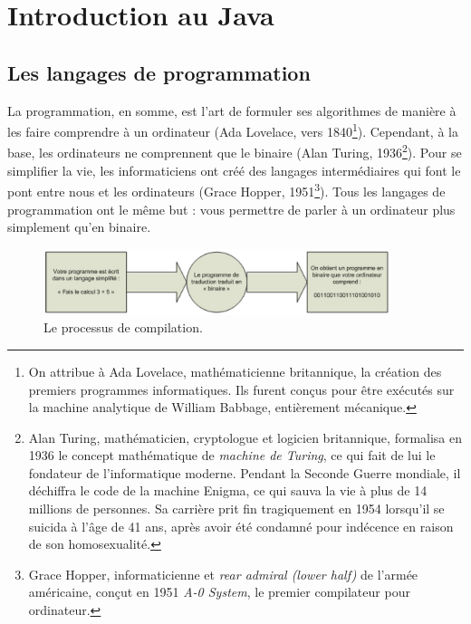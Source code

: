 \documentclass[12pt]{report}
\begin{document}
\chapter{Introduction au Java}
%
%
%
\section{Les langages de programmation}
La programmation, en somme, est l'art de formuler ses algorithmes de manière à les faire comprendre à un ordinateur (Ada Lovelace, vers 1840\footnote{On attribue à Ada Lovelace, mathématicienne britannique, la création des premiers programmes informatiques. Ils furent conçus pour être exécutés sur la machine analytique de William Babbage, entièrement mécanique.}). Cependant, à la base, les ordinateurs ne comprennent que le binaire (Alan Turing, 1936\footnote{Alan Turing, mathématicien, cryptologue et logicien britannique, formalisa en 1936 le concept mathématique de \emph{machine de Turing}, ce qui fait de lui le fondateur de l'informatique moderne. Pendant la Seconde Guerre mondiale, il déchiffra le code de la machine Enigma, ce qui sauva la vie à plus de 14 millions de personnes. Sa carrière prit fin tragiquement en 1954 lorsqu'il se suicida à l'âge de 41 ans, après avoir été condamné pour indécence en raison de son homosexualité.}). Pour se simplifier la vie, les informaticiens ont créé des langages intermédiaires qui font le pont entre nous et les ordinateurs (Grace Hopper, 1951\footnote{Grace Hopper, informaticienne et \emph{rear admiral (lower half)} de l'armée américaine, conçut en 1951 \emph{A-0 System}, le premier compilateur pour ordinateur.}). Tous les langages de programmation ont le même but : vous permettre de parler à un ordinateur plus simplement qu'en binaire.
%
%
%
\begin{figure}[!htbp]
  \centering
  \includegraphics[width=0.9\textwidth]{compilation.png}
  \caption{Le processus de compilation.}
\end{figure}
\end{document}
